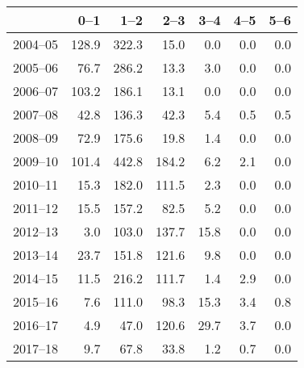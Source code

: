 \begin{table}[ht]
\centering
\begin{tabular}{rrrrrrr}
  \hline
 & 0--1 & 1--2 & 2--3 & 3--4 & 4--5 & 5--6 \\ 
  \hline
2004--05 & 128.9 & 322.3 & 15.0 & 0.0 & 0.0 & 0.0 \\ 
  2005--06 & 76.7 & 286.2 & 13.3 & 3.0 & 0.0 & 0.0 \\ 
  2006--07 & 103.2 & 186.1 & 13.1 & 0.0 & 0.0 & 0.0 \\ 
  2007--08 & 42.8 & 136.3 & 42.3 & 5.4 & 0.5 & 0.5 \\ 
  2008--09 & 72.9 & 175.6 & 19.8 & 1.4 & 0.0 & 0.0 \\ 
  2009--10 & 101.4 & 442.8 & 184.2 & 6.2 & 2.1 & 0.0 \\ 
  2010--11 & 15.3 & 182.0 & 111.5 & 2.3 & 0.0 & 0.0 \\ 
  2011--12 & 15.5 & 157.2 & 82.5 & 5.2 & 0.0 & 0.0 \\ 
  2012--13 & 3.0 & 103.0 & 137.7 & 15.8 & 0.0 & 0.0 \\ 
  2013--14 & 23.7 & 151.8 & 121.6 & 9.8 & 0.0 & 0.0 \\ 
  2014--15 & 11.5 & 216.2 & 111.7 & 1.4 & 2.9 & 0.0 \\ 
  2015--16 & 7.6 & 111.0 & 98.3 & 15.3 & 3.4 & 0.8 \\ 
  2016--17 & 4.9 & 47.0 & 120.6 & 29.7 & 3.7 & 0.0 \\ 
  2017--18 & 9.7 & 67.8 & 33.8 & 1.2 & 0.7 & 0.0 \\ 
   \hline
\end{tabular}
\end{table}
